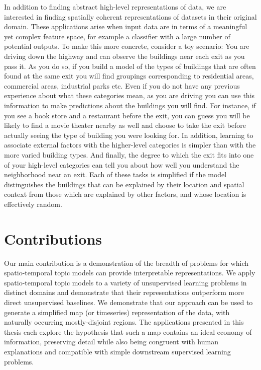 In addition to finding abstract high-level representations of data, we are interested in finding spatially coherent representations of datasets in their original domain. These applications arise when input data are in terms of a meaningful yet complex feature space, for example a classifier with a large number of potential outputs. To make this more concrete, consider a toy scenario: You are driving down the highway and can observe the buildings near each exit as you pass it. As you do so, if you build a model of the types of buildings that are often found at the same exit you will find groupings corresponding to residential areas, commercial areas, industrial parks etc. Even if you do not have any previous experience about what these categories mean, as you are driving you can use this information to make predictions about the buildings you will find. For instance, if you see a book store and a restaurant before the exit, you can guess you will be likely to find a movie theater nearby as well and choose to take the exit before actually seeing the type of building you were looking for. In addition, learning to associate external factors with the higher-level categories is simpler than with the more varied building types. And finally, the degree to which the exit fits into one of your high-level categories can tell you about how well you understand the neighborhood near an exit. Each of these tasks is simplified if the model distinguishes the buildings that can be explained by their location and spatial context from those which are explained by other factors, and whose location is effectively random.

\section{Contributions}
Our main contribution is a demonstration of the breadth of problems for which spatio-temporal topic models can provide interpretable representations. We apply spatio-temporal topic models to a variety of unsupervised learning problems in distinct domains and demonstrate that their representations outperform more direct unsupervised baselines. We demonstrate that our approach can be used to generate a simplified map (or timeseries) representation of the data, with naturally occurring mostly-disjoint regions. The applications presented in this thesis each explore the hypothesis that such a map contains an ideal economy of information, preserving detail while also being congruent with human explanations and compatible with simple downstream supervised learning problems.

